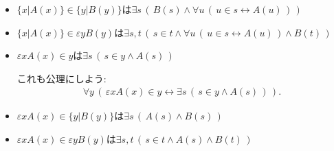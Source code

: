 \documentclass[a4j,10.5pt,oneside,openany]{jsbook}
\begin{document}
\begin{itemize}
\begin{align}
				\forall u\, \left(\, u \in s \leftrightarrow A(u)\, \right)\, \right)
			\end{align}
			が成り立っているとして，
			\begin{align}
				\sigma = \varepsilon s\, \left(\, s \in \eta \wedge 
				\forall u\, \left(\, u \in s \leftrightarrow A(u)\, \right)\, \right)
			\end{align}
			としよう．すると
			\begin{align}
				\sigma \in \eta \wedge 
				\forall u\, \left(\, u \in \sigma \leftrightarrow A(u)\, \right)
			\end{align}
			が成り立つので
			\begin{align}
				\sigma \in \eta
			\end{align}
			かつ
			\begin{align}
				\sigma = \{x|A(x)\}
			\end{align}
			が成立する．ゆえに
			\begin{align}
				\{x|A(x)\} \in \eta
			\end{align}
			が成立する．以上で
			\begin{align}
				\{x|A(x)\} \in \eta \leftrightarrow
				\exists s\, \left(\, s \in \eta \wedge 
				\forall u\, \left(\, u \in s \leftrightarrow A(u)\, \right)\, \right)
			\end{align}
			が得られた．
			
		\item $\{x|A(x)\} \in \{y|B(y)\}$は$\exists s\, \left(\, B(s) \wedge 
			\forall u\, \left(\, u \in s \leftrightarrow A(u)\, \right)\, \right)$
		
		\item $\{x|A(x)\} \in \varepsilon y B(y)$は$\exists s,t\, \left(\, s \in t \wedge 
			\forall u\, \left(\, u \in s \leftrightarrow A(u)\, \right) \wedge B(t)\, \right)$
		
		\item $\varepsilon x A(x) \in y$は$\exists s\, \left(\, s \in y \wedge A(s)\, \right)$
			
			これも公理にしよう:
			\begin{align}
				\forall y\, \left(\, \varepsilon x A(x) \in y \leftrightarrow
				\exists s\, \left(\, s \in y \wedge A(s)\, \right)\, \right).
			\end{align}
		
		\item $\varepsilon x A(x) \in \{y|B(y)\}$は$\exists s\, \left(\, A(s) \wedge B(s)\, \right)$
		
		\item $\varepsilon x A(x) \in \varepsilon y B(y)$は$\exists s,t\, \left(\, s \in t \wedge A(s) \wedge B(t)\, \right)$
	\end{itemize}
\end{document}
